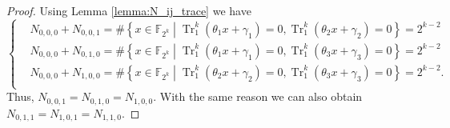 \documentclass{article}
\newcommand{\F}{\mathbb{F}}
\newcommand{\0}{\textbf{0}}
\newcommand{\1}{\textbf{1}}
\newcommand{\TRACE}{\operatorname{Tr}_1^k}
\theoremstyle{plain}
\begin{document}
    \begin{proof}
        Using Lemma \ref{lemma:N_ij_trace} we have  
        \begin{equation}\label{eq:from_lemma_1}\left\{\begin{alignedat}{3}
        &N_{0,0,0}+N_{0,0,1}=\#\left\{x\in\F_{2^k}\middle|\TRACE\left(\theta_1x+\gamma_1\right)=0, \TRACE\left(\theta_2x+\gamma_2\right)=0\right\}=2^{k-2}\\
        &N_{0,0,0}+N_{0,1,0}=\#\left\{x\in\F_{2^k}\middle|\TRACE\left(\theta_1x+\gamma_1\right)=0, \TRACE\left(\theta_3x+\gamma_3\right)=0\right\}=2^{k-2}\\
        &N_{0,0,0}+N_{1,0,0}=\#\left\{x\in\F_{2^k}\middle|\TRACE\left(\theta_2x+\gamma_2\right)=0, \TRACE\left(\theta_3x+\gamma_3\right)=0\right\}=2^{k-2}.\\
        \end{alignedat}\right.\end{equation}
        Thus, $N_{0,0,1}=N_{0,1,0}=N_{1,0,0}$. With the same reason we can also obtain  $N_{0,1,1}=N_{1,0,1}=N_{1,1,0}$. 


\end{proof}
\end{document}
